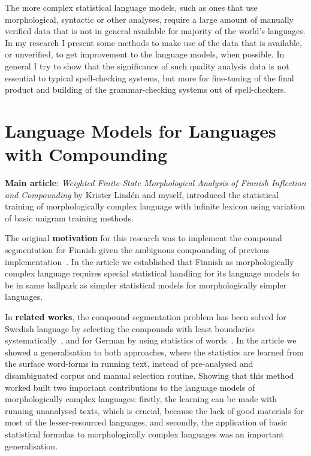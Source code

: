 \documentclass[officiallayout]{unihelcompling}
\begin{document}
The more complex statistical language models, such as ones that use
morphological, syntactic or other analyses, require a large amount of
manually verified data that is not in general available for majority of the
world's languages. In my research I present some methods to make use of the
data that is available, or unverified, to get improvement to the language
models, when possible. In general I try to show that the significance of such
quality analysis data is not essential to typical spell-checking systems, but
more for fine-tuning of the final product and building of the grammar-checking
systems out of spell-checkers.


\section{Language Models for Languages with Compounding}
\label{sec:compounding}

\textbf{Main article}: \emph{Weighted Finite-State Morphological Analysis of
Finnish Inflection and Compounding}  by Krister
Lindén and myself, introduced the statistical training of morphologically
complex language with infinite lexicon using variation of basic unigram
training methods.

The original \textbf{motivation} for this research was to implement the
compound segmentation for Finnish given the ambiguous compounding of previous
implementation~\citep{pirinen2008suomen}. In the article we established that
Finnish as morphologically complex language requires special statistical
handling for its language models to be in same ballpark as simpler statistical
models for morphologically simpler languages.

In \textbf{related works}, the compound segmentation problem has been solved
for Swedish language by selecting the compounds with least boundaries
systematically~\citep{karlsson1992swetwol}, and for German by using statistics
of words~\citep{schiller2006german}. In the article we showed a generalisation
to both approaches, where the statistics are learned from the surface
word-forms in running text, instead of pre-analysed and disambiguated corpus
and manual selection routine.  Showing that this method worked built two
important contributions to the language models of morphologically complex
languages: firstly, the learning can be made with running unanalysed texts,
which is crucial, because the lack of good materials for most of the
lesser-resourced languages, and secondly, the application of basic statistical
formulas to morphologically complex languages was an important generalisation.
\end{document}

